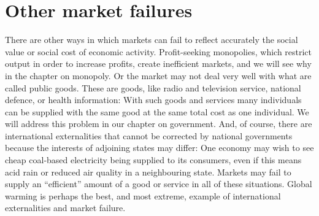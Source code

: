 \section{Other market failures}\label{sec:ch5sec6}

There are other ways in which markets can fail to reflect accurately the
social value or social cost of economic activity. Profit-seeking monopolies,
which restrict output in order to increase profits, create inefficient
markets, and we will see why in the chapter on monopoly. Or the market may
not deal very well with what are called public goods. These are goods, like
radio and television service, national defence, or health information: With
such goods and services many individuals can be supplied with the same good
at the same total cost as one individual. We will address this problem in
our chapter on government. And, of course, there are international
externalities that cannot be corrected by national governments because the
interests of adjoining states may differ: One economy may wish to see cheap
coal-based electricity being supplied to its consumers, even if this means
acid rain or reduced air quality in a neighbouring state. Markets may fail
to supply an ``efficient'' amount of a good
or service in all of these situations. Global warming is perhaps the best,
and most extreme, example of international externalities and market failure.